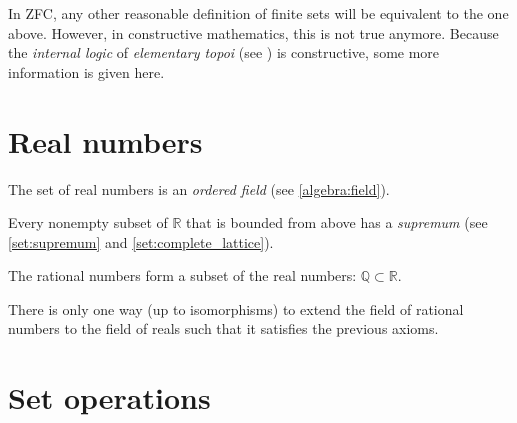     In ZFC, any other reasonable definition of finite sets will be equivalent to the one above. However, in constructive mathematics, this is not true anymore. Because the \textit{internal logic} of \textit{elementary topoi} (see ) is constructive, some more information is given here.



\section{Real numbers}

    \begin{axiom}[Ordering]
        The set of real numbers is an \textit{ordered field} (see \cref{algebra:field}).
    \end{axiom}
    \begin{axiom}\label{set:dedekind_completeness}
        Every nonempty subset of $\mathbb{R}$ that is bounded from above has a \textit{supremum} (see \cref{set:supremum} and \cref{set:complete_lattice}).
    \end{axiom}

    \begin{axiom}
        The rational numbers form a subset of the real numbers: $\mathbb{Q}\subset\mathbb{R}$.
    \end{axiom}

    \begin{remark}
        There is only one way (up to isomorphisms) to extend the field of rational numbers to the field of reals such that it satisfies the previous axioms.
    \end{remark}


\section{Set operations}

